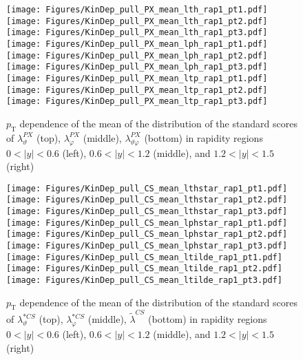 \documentclass[12pt]{article}
\newcommand{\pT}{p_\mathrm{T}}
\newcommand{\absy}{\left |  y \right |}
\newcommand{\lamtildeCS}{\tilde{\lambda}^{\scriptscriptstyle CS}}
\newcommand{\lamthstarCS}{\lambda^{* \scriptscriptstyle CS}_\vartheta}
\newcommand{\lamphstarCS}{\lambda^{* \scriptscriptstyle CS}_\varphi}
\newcommand{\lamthPX}{\lambda^{\scriptscriptstyle PX}_\vartheta}
\newcommand{\lamphPX}{\lambda^{\scriptscriptstyle PX}_\varphi}
\newcommand{\lamthphPX}{\lambda^{\scriptscriptstyle PX}_{\vartheta \varphi}}
\begin{document}
\begin{figure}[htbp]
\centering
\texttt{[image: Figures/KinDep\_pull\_PX\_mean\_lth\_rap1\_pt1.pdf]}
\texttt{[image: Figures/KinDep\_pull\_PX\_mean\_lth\_rap1\_pt2.pdf]}
\texttt{[image: Figures/KinDep\_pull\_PX\_mean\_lth\_rap1\_pt3.pdf]}
\texttt{[image: Figures/KinDep\_pull\_PX\_mean\_lph\_rap1\_pt1.pdf]}
\texttt{[image: Figures/KinDep\_pull\_PX\_mean\_lph\_rap1\_pt2.pdf]}
\texttt{[image: Figures/KinDep\_pull\_PX\_mean\_lph\_rap1\_pt3.pdf]}
\texttt{[image: Figures/KinDep\_pull\_PX\_mean\_ltp\_rap1\_pt1.pdf]}
\texttt{[image: Figures/KinDep\_pull\_PX\_mean\_ltp\_rap1\_pt2.pdf]}
\texttt{[image: Figures/KinDep\_pull\_PX\_mean\_ltp\_rap1\_pt3.pdf]}
\caption{$\pT$ dependence of the mean of the distribution of the standard scores
of $\lamthPX$ (top), $\lamphPX$ (middle), $\lamthphPX$ (bottom) in rapidity
regions $0<\absy<0.6$ (left), $0.6<\absy<1.2$ (middle), and $1.2<\absy<1.5$ (right)}
\end{figure}
\clearpage


\begin{figure}[htbp]
\centering
\texttt{[image: Figures/KinDep\_pull\_CS\_mean\_lthstar\_rap1\_pt1.pdf]}
\texttt{[image: Figures/KinDep\_pull\_CS\_mean\_lthstar\_rap1\_pt2.pdf]}
\texttt{[image: Figures/KinDep\_pull\_CS\_mean\_lthstar\_rap1\_pt3.pdf]}
\texttt{[image: Figures/KinDep\_pull\_CS\_mean\_lphstar\_rap1\_pt1.pdf]}
\texttt{[image: Figures/KinDep\_pull\_CS\_mean\_lphstar\_rap1\_pt2.pdf]}
\texttt{[image: Figures/KinDep\_pull\_CS\_mean\_lphstar\_rap1\_pt3.pdf]}
\texttt{[image: Figures/KinDep\_pull\_CS\_mean\_ltilde\_rap1\_pt1.pdf]}
\texttt{[image: Figures/KinDep\_pull\_CS\_mean\_ltilde\_rap1\_pt2.pdf]}
\texttt{[image: Figures/KinDep\_pull\_CS\_mean\_ltilde\_rap1\_pt3.pdf]}
\caption{$\pT$ dependence of the mean of the distribution of the standard scores
of $\lamthstarCS$ (top), $\lamphstarCS$ (middle), $\lamtildeCS$ (bottom) in rapidity
regions $0<\absy<0.6$ (left), $0.6<\absy<1.2$ (middle), and $1.2<\absy<1.5$ (right)}
\end{figure}
\clearpage
\end{document}
